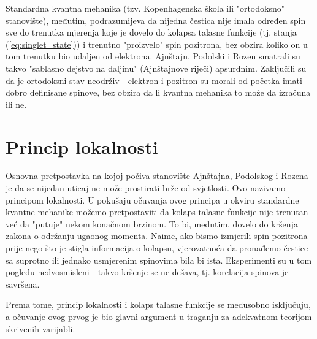 Standardna kvantna mehanika (tzv. Kopenhagenska škola ili "ortodoksno" stanovište), međutim,  podrazumijeva da nijedna čestica nije imala određen spin sve do trenutka mjerenja koje je dovelo do kolapsa talasne funkcije (tj. stanja (\ref{eq:singlet_state})) i trenutno "proizvelo" spin pozitrona, bez obzira koliko on u tom trenutku bio udaljen od elektrona.
Ajnštajn, Podolski i Rozen smatrali su takvo "sablasno dejstvo na daljinu" (Ajnštajnove riječi) apsurdnim. Zaključili su da je ortodoksni stav neodrživ - elektron i pozitron su morali od početka imati dobro definisane spinove, bez obzira da li kvantna mehanika to može da izračuna ili ne.

\section{Princip lokalnosti}

Osnovna pretpostavka na kojoj počiva stanovište Ajnštajna, Podolskog i Rozena je da se nijedan uticaj ne može prostirati brže od svjetlosti. Ovo nazivamo principom lokalnosti. U pokušaju očuvanja ovog principa u okviru standardne kvantne mehanike možemo pretpostaviti da kolaps talasne funkcije nije trenutan već da "putuje" nekom konačnom brzinom. To bi, međutim, dovelo do kršenja zakona o održanju ugaonog momenta.
Naime, ako bismo izmjerili spin pozitrona prije nego što je stigla informacija o kolapsu, vjerovatnoća da pronađemo čestice sa suprotno ili jednako usmjerenim spinovima bila bi ista. Eksperimenti su u tom pogledu nedvosmisleni - takvo kršenje se ne dešava, tj. korelacija spinova je savršena.

Prema tome, princip lokalnosti i kolaps talasne funkcije se međusobno isključuju, a očuvanje ovog prvog je bio glavni argument u traganju za adekvatnom teorijom skrivenih varijabli.